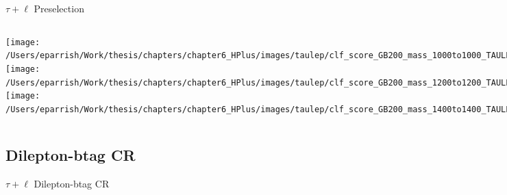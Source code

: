 \documentclass[aspectratio=169,xcolor=table]{beamer}
\begin{document}
    \begin{frame}[t]{$\tau+\ell$ Preselection}
      \begin{columns}[t]
          \texttt{[image: /Users/eparrish/Work/thesis/chapters/chapter6\_HPlus/images/taulep/clf\_score\_GB200\_mass\_1000to1000\_TAULEP\_PRESEL.png]}
          \texttt{[image: /Users/eparrish/Work/thesis/chapters/chapter6\_HPlus/images/taulep/clf\_score\_GB200\_mass\_1200to1200\_TAULEP\_PRESEL.png]}
          \texttt{[image: /Users/eparrish/Work/thesis/chapters/chapter6\_HPlus/images/taulep/clf\_score\_GB200\_mass\_1400to1400\_TAULEP\_PRESEL.png]}

          \texttt{[image: /Users/eparrish/Work/thesis/chapters/chapter6\_HPlus/images/taulep/clf\_score\_GB200\_mass\_1600to1600\_TAULEP\_PRESEL.png]}
          \texttt{[image: /Users/eparrish/Work/thesis/chapters/chapter6\_HPlus/images/taulep/clf\_score\_GB200\_mass\_1800to1800\_TAULEP\_PRESEL.png]}
          \texttt{[image: /Users/eparrish/Work/thesis/chapters/chapter6\_HPlus/images/taulep/clf\_score\_GB200\_mass\_2000to2000\_TAULEP\_PRESEL.png]}

          \texttt{[image: /Users/eparrish/Work/thesis/chapters/chapter6\_HPlus/images/taulep/clf\_score\_GB200\_mass\_2500to2500\_TAULEP\_PRESEL.png]}
          \texttt{[image: /Users/eparrish/Work/thesis/chapters/chapter6\_HPlus/images/taulep/clf\_score\_GB200\_mass\_3000to3000\_TAULEP\_PRESEL.png]}


      \end{columns}
    \end{frame}

  \subsection{Dilepton-btag CR}

    \begin{frame}[c]{$\tau+\ell$ Dilepton-btag CR}
      \begin{table}
      \end{table}
    \end{frame}
\end{document}
